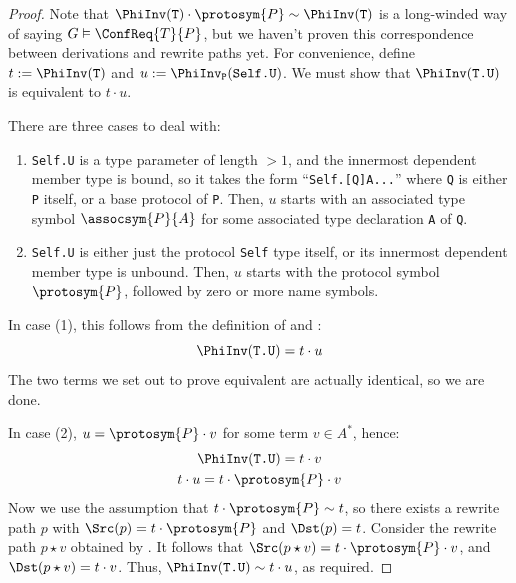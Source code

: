 \documentclass[../generics]{subfiles}
\begin{document}
\begin{proof}
Note that $\PhiInv(\texttt{T})\cdot\protosym{P}\sim\PhiInv(\texttt{T})$ is a long-winded way of saying $G\vDash\ConfReq{T}{P}$, but we haven't proven this correspondence between derivations and rewrite paths yet. For convenience, define $t:=\PhiInv(\texttt{T})$ and $u:=\PhiInv_\texttt{P}(\texttt{Self.U})$. We must show that $\PhiInv(\texttt{T.U})$ is equivalent to $t\cdot u$.

There are three cases to deal with:
\begin{enumerate}
\item \texttt{Self.U} is a type parameter of length $>1$, and the innermost dependent member type is bound, so it takes the form ``\texttt{Self.[Q]A...}'' where \texttt{Q} is either \texttt{P} itself, or a base protocol of \texttt{P}. Then, $u$ starts with an associated type symbol $\assocsym{P}{A}$ for some associated type declaration \texttt{A} of \texttt{Q}.
\item \texttt{Self.U} is either just the protocol \texttt{Self} type itself, or its innermost dependent member type is unbound. Then, $u$ starts with the protocol symbol $\protosym{P}$, followed by zero or more name symbols.
\end{enumerate}

In case (1), this follows from the definition of  and :
\[\PhiInv(\texttt{T.U})=t\cdot u\]
The two terms we set out to prove equivalent are actually identical, so we are done.

In case (2), $u=\protosym{P}\cdot v$ for some term $v\in A^*$, hence:
\begin{gather*}
\PhiInv(\texttt{T.U})=t\cdot v\\
t\cdot u=t\cdot \protosym{P}\cdot v
\end{gather*}
Now we use the assumption that $t\cdot\protosym{P}\sim t$, so there exists a rewrite path $p$ with $\Src(p)=t\cdot\protosym{P}$ and $\Dst(p)=t$. Consider the rewrite path $p\star v$ obtained by . It follows that $\Src(p\star v)=t\cdot\protosym{P}\cdot v$, and $\Dst(p\star v)=t\cdot v$. Thus,
$\PhiInv(\texttt{T.U})\sim t\cdot u$, as required.
\end{proof}
\end{document}

